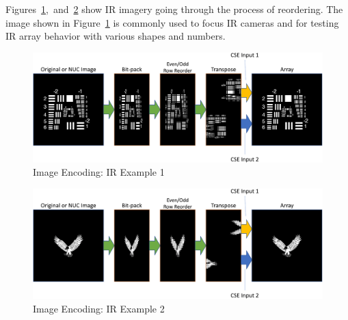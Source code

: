     Figures~\ref{fig:image_encoding_ir_example1},~and~\ref{fig:image_encoding_ir_example2} show IR imagery going through the process of reordering. The image shown in Figure~\ref{fig:image_encoding_ir_example1} is commonly used to focus IR cameras and for testing IR array behavior with various shapes and numbers.

    \begin{figure}
        \centering
        \includegraphics[trim=0in 0in 0in 0in,width=1.0\textwidth]{fig/image_encoding_ir1.pdf}
        \caption{Image Encoding: IR Example 1}
        \label{fig:image_encoding_ir_example1}
    \end{figure}

    \begin{figure}
        \centering
        \includegraphics[trim=0in 0in 0in 0in,width=1.0\textwidth]{fig/image_encoding_ir2.pdf}
        \caption{Image Encoding: IR Example 2}
        \label{fig:image_encoding_ir_example2}
    \end{figure}
